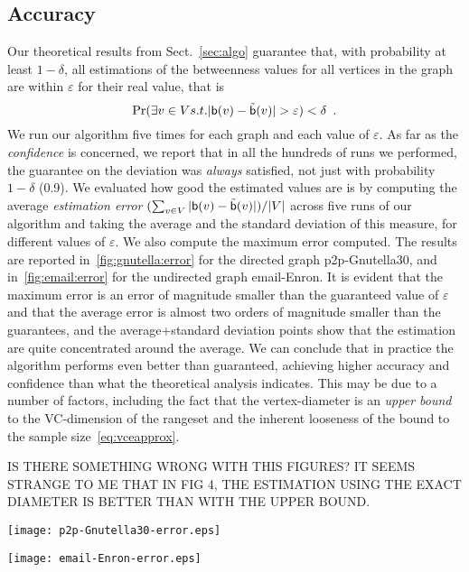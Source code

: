 \subsection{Accuracy}\label{sec:accuracy}
Our theoretical results from Sect.~\ref{sec:algo} guarantee that, with probability
at least $1-\delta$, all estimations of the betweenness values for all vertices
in the graph are within $\varepsilon$ for their real value, that is
\[
\Pr(\exists v\in V \mbox{ s.t. }
|\betw(v)-\tilde\betw(v)|>\varepsilon)<\delta\enspace.
\]
We run our algorithm five times for each graph and each value of $\varepsilon$.
As far as the \emph{confidence} is concerned, we report that in all the
hundreds of runs we performed, the guarantee on the deviation was \emph{always}
satisfied, not just with probability $1-\delta$ (0.9). We evaluated how good the
estimated values are is by computing the average \emph{estimation error}
$(\sum_{v\in V}|\mathsf{b}(v)-\tilde{\mathsf{b}}(v)|)/|V|$ across five runs of our algorithm
and taking the average and the standard deviation of this measure, for different values of
$\varepsilon$. We also compute the maximum error computed. The results are
reported in~\cref{fig:gnutella:error} for the directed graph p2p-Gnutella30, and
in~\cref{fig:email:error} for the undirected graph email-Enron. It is evident
that the maximum error is an error of magnitude smaller than the guaranteed value
of $\varepsilon$ and that the average error is almost two orders of magnitude
smaller than the guarantees, and the average+standard deviation points show that
the estimation are quite concentrated around the average. We can conclude that
in practice the algorithm performs even better than guaranteed, achieving higher
accuracy and confidence than what the theoretical analysis indicates. This may
be due to a number of factors, including the fact that the vertex-diameter is an
\emph{upper bound} to the VC-dimension of the rangeset and the inherent
looseness of the bound to the sample size~\eqref{eq:vceapprox}.

\XXX IS THERE SOMETHING WRONG WITH THIS FIGURES? IT SEEMS STRANGE TO ME THAT IN
FIG 4, THE ESTIMATION USING THE EXACT DIAMETER IS BETTER THAN WITH THE UPPER
BOUND.

\begin{figure*}[ht]
\begin{minipage}[b]{0.5\linewidth}
\flushleft
\texttt{[image: p2p-Gnutella30-error.eps]}
\caption{Error evaluation on p2p-Gnutella30} \label{fig:gnutella:error}
\end{minipage}%
\begin{minipage}[b]{0.5\linewidth}
\centering
\texttt{[image: email-Enron-error.eps]}
\caption{Error evaluation on email-Enron} \label{fig:email:error}
\end{minipage}
\end{figure*}

